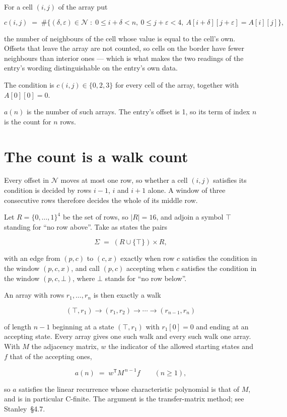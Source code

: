 \documentclass[11pt]{article}
\theoremstyle{definition}
\begin{document}
For a cell $(i,j)$ of the array put

\[c(i,j) \;=\; \#\bigl\{(\delta,\varepsilon)\in\mathcal{N} \;:\; 0\le i+\delta<n,\ 0\le j+\varepsilon<4,\ A[i+\delta][j+\varepsilon] = A[i][j]\bigr\},\]

the number of neighbours of the cell whose value is equal to the cell's own. Offsets that leave the array are not counted, so cells on the border have fewer neighbours than interior ones --- which is what makes the two readings of the entry's wording distinguishable on the entry's own data.

The condition is $c(i,j) \in \{0, 2, 3\}$ for every cell of the array, together with $A[0][0]=0$.

$a(n)$ is the number of such arrays. The entry's offset is 1, so its term of index $n$ is the count for $n$ rows.

\section{The count is a walk count}

Every offset in $\mathcal{N}$ moves at most one row, so whether a cell $(i,j)$ satisfies its condition is decided by rows $i-1$, $i$ and $i+1$ alone. A window of three consecutive rows therefore decides the whole of its middle row.

Let $R = \{0,\dots,1\}^{4}$ be the set of rows, so $|R| = 16$, and adjoin a symbol $\top$ standing for ``no row above''. Take as states the pairs

\[\Sigma \;=\; (R \cup \{\top\}) \times R,\]

with an edge from $(p,c)$ to $(c,x)$ exactly when row $c$ satisfies the condition in the window $(p,c,x)$, and call $(p,c)$ accepting when $c$ satisfies the condition in the window $(p,c,\bot)$, where $\bot$ stands for ``no row below''.

An array with rows $r_1,\dots,r_n$ is then exactly a walk

\[(\top,r_1) \to (r_1,r_2) \to \cdots \to (r_{n-1},r_n)\]

of length $n-1$ beginning at a state $(\top,r_1)$ with $r_1[0]=0$ and ending at an accepting state. Every array gives one such walk and every such walk one array. With $M$ the adjacency matrix, $w$ the indicator of the allowed starting states and $f$ that of the accepting ones,

\[a(n) \;=\; w^{\mathsf T} M^{\,n-1} f \qquad (n \ge 1),\]

so $a$ satisfies the linear recurrence whose characteristic polynomial is that of $M$, and is in particular C-finite. The argument is the transfer-matrix method; see Stanley~\S4.7.
\end{document}
